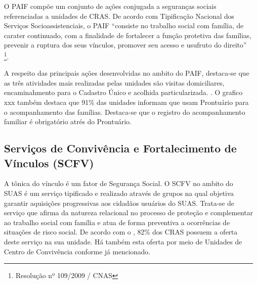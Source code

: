 \documentclass[
  brazilian]{report}
\begin{document}
O PAIF compõe um conjunto de ações conjugada a seguranças sociais
referenciadas a unidades de CRAS. De acordo com Tipificação Nacional dos
Serviços Socioassistenciais, o PAIF ``consiste no trabalho social com
família, de carater continuado, com a finalidade de fortalecer a função
protetiva das famílias, prevenir a ruptura dos seus vínculos, promover
seu acesso e usufruto do direito''
\footnote{Resolução nº 109/2009 / CNAS}.

A respeito das principais ações desenvolvidas no ambito do PAIF,
destaca-se que as três atividades mais realizadas pelas unidades são
visitas domiciliares, encaminahmento para o Cadastro Único e acolhida
particularizada. . O grafico xxx também destaca que 91\% das unidades
informam que usam Prontuário para o acompanhamento das famílias.
Destaca-se que o registro do acompanhamento familiar é obrigatório atrés
do Prontuário.

\hypertarget{serviuxe7os-de-convivuxeancia-e-fortalecimento-de-vuxednculos-scfv}{%
\subsection{Serviços de Convivência e Fortalecimento de Vínculos
(SCFV)}\label{serviuxe7os-de-convivuxeancia-e-fortalecimento-de-vuxednculos-scfv}}

A tônica do vínculo é um fator de Segurança Social. O SCFV no ambito do
SUAS é um serviço tipificado e realizado através de grupos na qual
objetiva garantir aquisições progressivas aos cidadãos usuários do SUAS.
Trata-se de serviço que afirma da natureza relacional no processo de
proteção e complementar ao trabalho social com família e atua de forma
preventiva a ocorrências de situações de risco social. De acordo com o
, 82\% dos CRAS possuem a oferta deste serviço na
sua unidade. Há também esta oferta por meio de Unidades de Centro de
Convivência conforme já mencionado.
\end{document}
